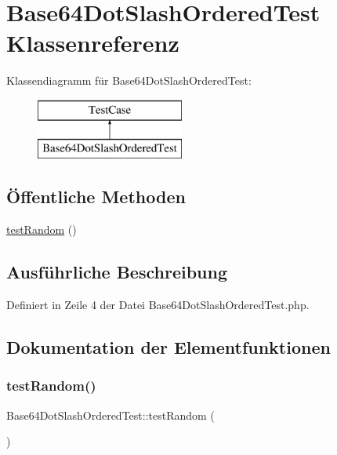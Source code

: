 \hypertarget{class_base64_dot_slash_ordered_test}{}\section{Base64\+Dot\+Slash\+Ordered\+Test Klassenreferenz}
\label{class_base64_dot_slash_ordered_test}
Klassendiagramm für Base64\+Dot\+Slash\+Ordered\+Test\+:\begin{figure}[H]
\begin{center}
\leavevmode
\includegraphics[height=2.000000cm]{class_base64_dot_slash_ordered_test}
\end{center}
\end{figure}
\subsection*{Öffentliche Methoden}
\begin{DoxyCompactItemize}
\item 
\mbox{\hyperlink{class_base64_dot_slash_ordered_test_a84ed010ec0e1d057ed5a3d1d03d4b1df}{test\+Random}} ()
\end{DoxyCompactItemize}


\subsection{Ausführliche Beschreibung}


Definiert in Zeile 4 der Datei Base64\+Dot\+Slash\+Ordered\+Test.\+php.



\subsection{Dokumentation der Elementfunktionen}
\mbox{\label{class_base64_dot_slash_ordered_test_a84ed010ec0e1d057ed5a3d1d03d4b1df}} 
\subsubsection{\texorpdfstring{test\+Random()}{testRandom()}}
{\footnotesize\ttfamily Base64\+Dot\+Slash\+Ordered\+Test\+::test\+Random (\begin{DoxyParamCaption}{ }\end{DoxyParamCaption})}

